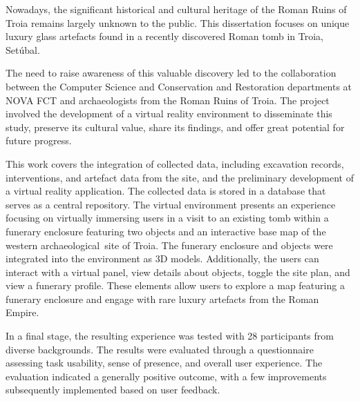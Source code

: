 
Nowadays, the significant historical and cultural heritage of the Roman Ruins of Troia remains largely unknown to the public. This dissertation focuses on unique luxury glass artefacts found in a recently discovered Roman tomb in Troia, Setúbal.

The need to raise awareness of this valuable discovery led to the collaboration between the Computer Science and Conservation and Restoration departments at NOVA FCT and archaeologists from the Roman Ruins of Troia. The project involved the development of a virtual reality environment to disseminate this study, preserve its cultural value, share its findings, and offer great potential for future progress.

This work covers the integration of collected data, including excavation records, interventions, and artefact data from the site, and the preliminary development of a virtual reality application. The collected data is stored in a database that serves as a central repository. The virtual environment presents an experience focusing on virtually immersing users in a visit to an existing tomb within a funerary enclosure featuring two objects and an interactive base map of the western archaeological site of Troia. The funerary enclosure and objects were integrated into the environment as 3D models. Additionally, the users can interact with a virtual panel, view details about objects, toggle the site plan, and view a funerary profile. These elements allow users to explore a map featuring a funerary enclosure and engage with rare luxury artefacts from the Roman Empire. 

In a final stage, the resulting experience was tested with 28 participants from diverse backgrounds. The results were evaluated through a questionnaire assessing task usability, sense of presence, and overall user experience. The evaluation indicated a generally positive outcome, with a few improvements subsequently implemented based on user feedback.

